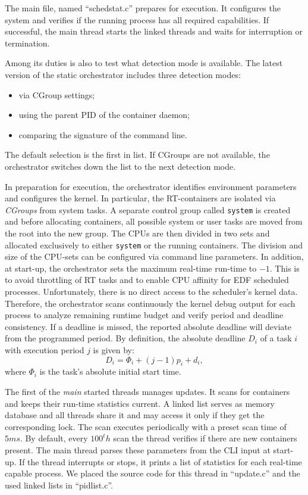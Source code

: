 \documentclass[]{scrartcl}
\begin{document}
The main file, named ``schedstat.c'' prepares for execution.
It configures the system and verifies if the running process has all required capabilities. 
If successful, the main thread starts the linked threads and waits for interruption or termination.

Among its duties is also to test what detection mode is available.
The latest version of the static orchestrator includes three detection modes:
\begin{itemize}
	\item via CGroup settings;
	\item using the parent PID of the container daemon;
	\item comparing the signature of the command line.
\end{itemize}
The default selection is the first in list. If CGroups are not available, the orchestrator switches down the list to the next detection mode.

In preparation for execution, the orchestrator identifies environment parameters and configures the kernel.
In particular, the RT-containers are isolated via %
\emph{CGroups} from system tasks.
A separate control group called \texttt{system} is created and before allocating containers, all possible system or user tasks are moved from the root into the new group.
The CPUs are then divided in two sets and allocated exclusively to either \texttt{system} or the running containers.
The division and size of the CPU-sets can be configured via command line parameters.
In addition, at start-up, the orchestrator sets the maximum real-time run-time to $-1$. This is to avoid throttling of RT tasks and to enable CPU affinity for EDF scheduled processes.
Unfortunately, there is no direct access to the scheduler's kernel data.
Therefore, the orchestrator scans continuously the kernel debug output for each process to analyze remaining runtime budget and verify period and deadline consistency. 
If a deadline is missed, the reported absolute deadline will deviate from the programmed period. By definition, the absolute deadline $D_i$ of a task $i$ with execution period $j$ is given by:
\begin{equation}
D_i = \Phi_i + (j-1) p_i + d_i,
\end{equation}
where $\Phi_i$ is the task's absolute initial start time.

The first of the \emph{main} started threads manages updates. It scans for containers and keeps their run-time statistics current.  
A linked list serves as memory database and all threads share it and may access it only if they get the corresponding lock.
The scan executes periodically with a preset scan time of $5ms$. 
By default, every $100^th$ scan the thread verifies if there are new containers present.
The main thread parses these parameters from the CLI input at start-up.
If the thread interrupts or stops, it prints a list of statistics for each real-time capable process.
We placed the source code for this thread in ``update.c'' and the used linked lists in ``pidlist.c''. 
\end{document}
